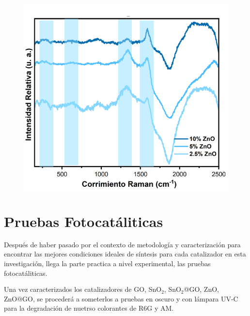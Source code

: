 \documentclass[12pt]{article}
\begin{document}
\begin{figure}[H]
    	   \begin{center}
     	  	\includegraphics[width = 1\textwidth]{Imagenes/RAMAN_ZnO_3.png}
    	   \end{center} 
        \end{figure}
        
\newpage

\section{Pruebas Fotocatáliticas}
Después de haber pasado por el contexto de metodología y caracterización para encontrar las mejores condiciones ideales de síntesis para cada catalizador en esta investigación, llega la parte practica a nivel experimental, las pruebas  fotocatáliticas.\vspace{1em} %

Una vez caracterizados los catalizadores de GO, SnO$\displaystyle _{2}$, SnO$\displaystyle _{2}$@GO, ZnO, ZnO@GO, se procederá a someterlos a pruebas en oscuro y con lámpara UV-C para la degradación de nuetrso colorantes 
de R6G y AM.\vspace{1em} %
\end{document}
